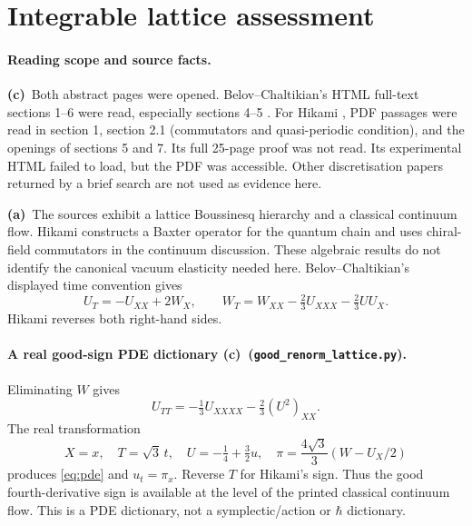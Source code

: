 \documentclass[11pt,a4paper]{article}
\newcommand{\A}{\textbf{(a)}\ }
\newcommand{\C}{\textbf{(c)}\ }
\newcommand{\file}[1]{\nolinkurl{#1}}
\newcommand{\lat}{\file{good_renorm_lattice.py}}
\begin{document}
\section{Integrable lattice assessment}
\paragraph{Reading scope and source facts.}
\C Both abstract pages were opened. Belov--Chaltikian's HTML full-text
sections 1--6 were read, especially sections 4--5 \cite{BC}.
For Hikami \cite{Hikami}, PDF passages were read in section 1,
section 2.1 (commutators and quasi-periodic condition), and the openings
of sections 5 and 7. Its full 25-page proof was not read. Its experimental
HTML failed to load, but the PDF was accessible. Other discretisation
papers returned by a brief search are not used as evidence here.

\A The sources exhibit a lattice Boussinesq hierarchy and a classical
continuum flow. Hikami constructs a Baxter operator for the quantum
chain and uses chiral-field commutators in the continuum discussion.
These algebraic results do not identify the canonical vacuum elasticity
needed here. Belov--Chaltikian's displayed time convention gives
\begin{equation}
 U_T=-U_{XX}+2W_X,\qquad
 W_T=W_{XX}-\tfrac23U_{XXX}-\tfrac23UU_X.\label{eq:source}
\end{equation}
Hikami reverses both right-hand sides.

\paragraph{A real good-sign PDE dictionary \C (\lat).}
Eliminating $W$ gives
\begin{equation}
 U_{TT}=-\tfrac13U_{XXXX}-\tfrac23(U^2)_{XX}.
\end{equation}
The real transformation
\begin{equation}
 X=x,\quad T=\sqrt3\,t,\quad U=-\tfrac14+\tfrac32u,
 \quad \pi=\frac{4\sqrt3}{3}(W-U_X/2)\label{eq:latticedict}
\end{equation}
produces \eqref{eq:pde} and $u_t=\pi_x$. Reverse $T$ for Hikami's sign.
Thus the good fourth-derivative sign is available at the level of the
printed classical continuum flow. This is a PDE dictionary, not a
symplectic/action or $\hbar$ dictionary.
\end{document}
